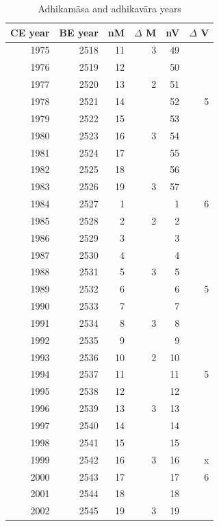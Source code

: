 \documentclass[11pt,oneside]{memoir-article}
\begin{document}
\begin{table}[h]
\begin{fullwidth}
\caption{\label{tbl-cycle-adhikamasa-adhikavara} Adhikamāsa and adhikavāra years}


\begin{multicols}{2}

\begin{center}
\begin{tabular}{rrrrrr}
CE year & BE year & nM & $\Delta$ M & nV & $\Delta$ V\\
\hline
1975 & 2518 & 11 & 3 & 49 & \\
1976 & 2519 & 12 &  & 50 & \\
1977 & 2520 & 13 & 2 & 51 & \\
1978 & 2521 & 14 &  & 52 & 5\\
1979 & 2522 & 15 &  & 53 & \\
1980 & 2523 & 16 & 3 & 54 & \\
1981 & 2524 & 17 &  & 55 & \\
1982 & 2525 & 18 &  & 56 & \\
1983 & 2526 & 19 & 3 & 57 & \\
1984 & 2527 & 1 &  & 1 & 6\\
1985 & 2528 & 2 & 2 & 2 & \\
1986 & 2529 & 3 &  & 3 & \\
1987 & 2530 & 4 &  & 4 & \\
1988 & 2531 & 5 & 3 & 5 & \\
1989 & 2532 & 6 &  & 6 & 5\\
1990 & 2533 & 7 &  & 7 & \\
1991 & 2534 & 8 & 3 & 8 & \\
1992 & 2535 & 9 &  & 9 & \\
1993 & 2536 & 10 & 2 & 10 & \\
1994 & 2537 & 11 &  & 11 & 5\\
1995 & 2538 & 12 &  & 12 & \\
1996 & 2539 & 13 & 3 & 13 & \\
1997 & 2540 & 14 &  & 14 & \\
1998 & 2541 & 15 &  & 15 & \\
1999 & 2542 & 16 & 3 & 16 & x\\
2000 & 2543 & 17 &  & 17 & 6\\
2001 & 2544 & 18 &  & 18 & \\
2002 & 2545 & 19 & 3 & 19 & \\
\end{tabular}
\end{center}


\end{multicols}
\end{fullwidth}
\end{table}
\end{document}
